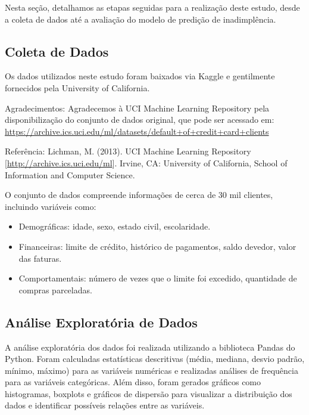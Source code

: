 \documentclass{abntpuc}
\begin{document}
Nesta seção, detalhamos as etapas seguidas para a realização deste estudo, desde a coleta de dados até a avaliação do modelo de predição de inadimplência.

\subsection{Coleta de Dados}
Os dados utilizados neste estudo foram baixados via Kaggle e gentilmente fornecidos pela University of California.

Agradecimentos: Agradecemos à UCI Machine Learning Repository pela disponibilização do conjunto de dados original, que pode ser acessado em: \\
\hypertarget{dataset_uci}{\url{https://archive.ics.uci.edu/ml/datasets/default+of+credit+card+clients}}


Referência: Lichman, M. (2013). UCI Machine Learning Repository [\hypertarget{uci}{\url{http://archive.ics.uci.edu/ml}}]. Irvine, CA: University of California, School of Information and Computer Science.

O conjunto de dados compreende informações de cerca de 30 mil clientes, incluindo variáveis como:

\begin{itemize}
    \item Demográficas: idade, sexo, estado civil, escolaridade.
    \item Financeiras: limite de crédito, histórico de pagamentos, saldo devedor, valor das faturas.
    \item Comportamentais: número de vezes que o limite foi excedido, quantidade de compras parceladas.
\end{itemize}

\subsection{Análise Exploratória de Dados}
A análise exploratória dos dados foi realizada utilizando a biblioteca Pandas do Python. Foram calculadas estatísticas descritivas (média, mediana, desvio padrão, mínimo, máximo) para as variáveis numéricas e realizadas análises de frequência para as variáveis categóricas.
Além disso, foram gerados gráficos como histogramas, boxplots e gráficos de dispersão para visualizar a distribuição dos dados e identificar possíveis relações entre as variáveis.
\end{document}
